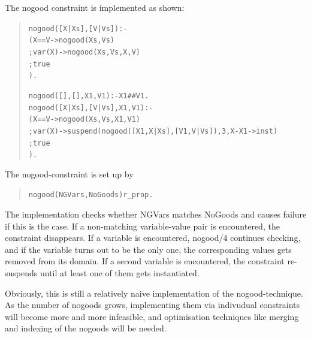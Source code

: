 The nogood constraint is implemented as shown:
\begin{quote}\begin{alltt}
nogood([X|Xs], [V|Vs]) :-
        ( X==V ->   nogood(Xs, Vs)
        ; var(X) -> nogood(Xs, Vs, X, V)
        ;           true
        ).

    nogood([], [], X1, V1) :- X1 ## V1.
    nogood([X|Xs], [V|Vs], X1, V1) :-
        ( X==V ->   nogood(Xs, Vs, X1, V1)
        ; var(X) -> suspend(nogood([X1,X|Xs], [V1,V|Vs]), 3, X-X1->inst)
        ;           true
        ).
\end{alltt}\end{quote}
\noindent
The nogood-constraint is set up by
\begin{quote}\begin{alltt}
nogood(NGVars, NoGoods) r_prop.
\end{alltt}\end{quote}
The implementation checks whether NGVars matches NoGoods and causes
failure if this is the case. If a non-matching variable-value pair is
encountered, the constraint disappears. If a variable is encountered,
nogood/4 continues checking, and if the variable turns out to be the only
one, the corresponding values gets removed from its domain.
If a second variable is encountered, the constraint re-suspends until
at least one of them gets instantiated.

Obviously, this is still a relatively naive implementation of the
nogood-technique. As the number of nogoods grows, implementing them
via indivudual constraints will become more and more infeasible, and
optimisation techniques like merging and indexing of the nogoods
will be needed.


